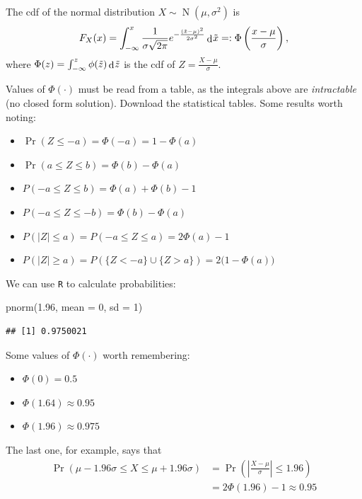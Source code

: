 \documentclass[
]{book}
\newenvironment{Shaded}{\begin{snugshade}}{\end{snugshade}}
\newcommand{\AttributeTok}[1]{\textcolor[rgb]{0.77,0.63,0.00}{#1}}
\newcommand{\DecValTok}[1]{\textcolor[rgb]{0.00,0.00,0.81}{#1}}
\newcommand{\FloatTok}[1]{\textcolor[rgb]{0.00,0.00,0.81}{#1}}
\newcommand{\FunctionTok}[1]{\textcolor[rgb]{0.00,0.00,0.00}{#1}}
\newcommand{\NormalTok}[1]{#1}
\providecommand{\tightlist}{%
  \setlength{\itemsep}{0pt}\setlength{\parskip}{0pt}}
\DeclareMathOperator{\N}{N}
\DeclareMathOperator{\dd}{d}
\newcommand{\dint}{\dd\hspace{0.5pt}\!}
\theoremstyle{definition}
\theoremstyle{definition}
\theoremstyle{definition}
\theoremstyle{definition}
\theoremstyle{remark}
\begin{document}
The cdf of the normal distribution \(X\sim\N(\mu,\sigma^2)\) is
\[
F_X(x) = \int_{-\infty}^x 
\frac{1}{\sigma\sqrt{2\pi}}e^{-\frac{(\tilde x-\mu)^2}{2\sigma^2}} \dint \tilde x =: \Phi\left(\frac{x-\mu}{\sigma} \right),
\]
where \(\Phi(z)=\int_{-\infty}^z \phi(\tilde z) \dint \tilde z\) is the cdf of \(Z=\frac{X-\mu}{\sigma}\).

Values of \(\Phi(\cdot)\) must be read from a table, as the integrals above are \emph{intractable} (no closed form solution). Download the statistical tables.
Some results worth noting:

\begin{itemize}
\tightlist
\item
  \(\Pr(Z \leq -a)=\Phi(-a)=1-\Phi(a)\)
\item
  \(\Pr(a \leq Z \leq b) = \Phi(b) - \Phi(a)\)
\item
  \(P(-a \leq Z \leq b) = \Phi(a) + \Phi(b) - 1\)
\item
  \(P(-a \leq Z \leq -b) = \Phi(b) - \Phi(a)\)
\item
  \(P(|Z| \leq a) = P(-a \leq Z \leq a) = 2\Phi(a) - 1\)
\item
  \(P(|Z| \geq a) = P(\{Z < -a\} \cup \{Z >a\}) = 2\big(1-\Phi(a)\big)\)
\end{itemize}

We can use \texttt{R} to calculate probabilities:

\begin{Shaded}
\begin{Highlighting}[]
\FunctionTok{pnorm}\NormalTok{(}\FloatTok{1.96}\NormalTok{, }\AttributeTok{mean =} \DecValTok{0}\NormalTok{, }\AttributeTok{sd =} \DecValTok{1}\NormalTok{)}
\end{Highlighting}
\end{Shaded}

\begin{verbatim}
## [1] 0.9750021
\end{verbatim}

Some values of \(\Phi(\cdot)\) worth remembering:

\begin{itemize}
\tightlist
\item
  \(\Phi(0) = 0.5\)
\item
  \(\Phi(1.64) \approx 0.95\)
\item
  \(\Phi(1.96) \approx 0.975\)
\end{itemize}

The last one, for example, says that
\begin{align*}
\Pr(\mu- 1.96\sigma \leq X \leq \mu+ 1.96\sigma) 
&= \Pr\left( \left| \frac{X-\mu}{\sigma} \right| \leq 1.96 \right)\\
&= 2\Phi(1.96)-1\approx 0.95
\end{align*}
\end{document}
